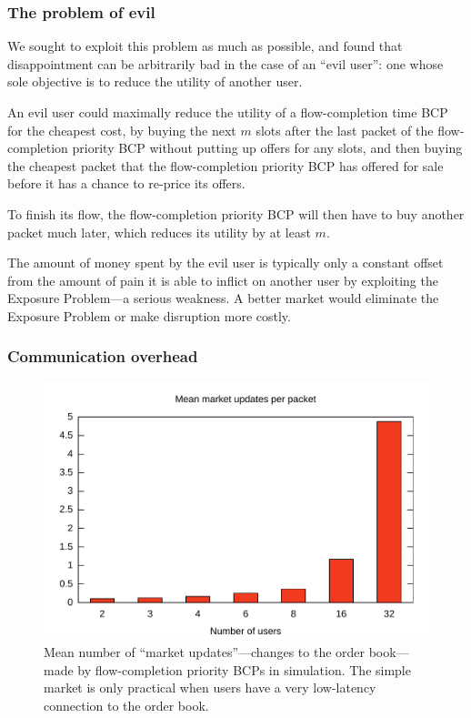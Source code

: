 \subsubsection{The problem of evil}
\label{ss:evil}
We sought to exploit this problem as much as possible, and found that
disappointment can be arbitrarily bad in the case of an ``evil user'':
one whose sole objective is to reduce the utility of another
user.

An evil user could maximally reduce the utility of a flow-completion
time BCP for the cheapest cost, by buying the next $m$ slots after the
last packet of the flow-completion priority BCP without putting up
offers for any slots, and then buying the cheapest packet that the
flow-completion priority BCP has offered for sale before it has a
chance to re-price its offers.

To finish its flow, the flow-completion priority BCP
will then have to buy another packet much later, which reduces its
utility by at least $m$.

The amount of money spent by the evil user is typically only a
constant offset from the amount of pain it is able to inflict on
another user by exploiting the Exposure Problem---a serious
weakness. A better market would eliminate the Exposure Problem or make
disruption more costly.

\subsubsection{Communication overhead}

\begin{figure}
\includegraphics[width=\columnwidth]{plots/num_market_updates.pdf}
\caption{Mean number of ``market updates''---changes to the order book---made by flow-completion
priority BCPs in simulation. The simple market is only practical when
users have a very low-latency connection to the order book.}
\label{f:num_market_updates}
\end{figure}

